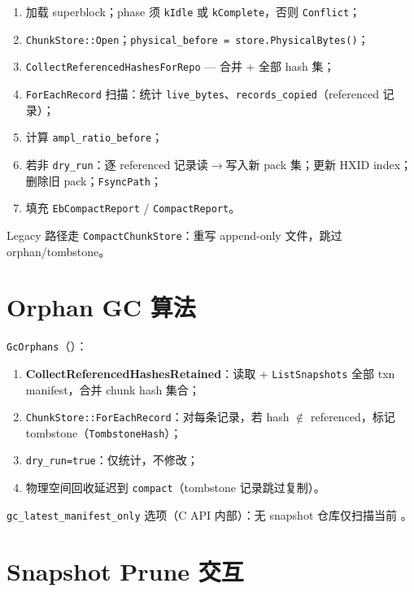 \begin{enumerate}
  \item 加载 superblock；phase 须 \texttt{kIdle} 或 \texttt{kComplete}，否则 \texttt{Conflict}；
  \item \texttt{ChunkStore::Open}；\texttt{physical\_before = store.PhysicalBytes()}；
  \item \texttt{CollectReferencedHashesForRepo} — 合并  + 全部  hash 集；
  \item \texttt{ForEachRecord} 扫描：统计 \texttt{live\_bytes}、\texttt{records\_copied}（referenced 记录）；
  \item 计算 \texttt{ampl\_ratio\_before}；
  \item 若非 \texttt{dry\_run}：逐 referenced 记录读$\rightarrow$写入新 pack 集；更新 HXID index；删除旧 pack；\texttt{FsyncPath}；
  \item 填充 \texttt{EbCompactReport} / \texttt{CompactReport}。
\end{enumerate}

Legacy  路径走 \texttt{CompactChunkStore}：重写 append-only 文件，跳过 orphan/tombstone。

\section{Orphan GC 算法}

\texttt{GcOrphans}（）：

\begin{enumerate}
  \item \textbf{CollectReferencedHashesRetained}：读取  + \texttt{ListSnapshots} 全部 txn manifest，合并 chunk hash 集合；
  \item \texttt{ChunkStore::ForEachRecord}：对每条记录，若 hash $\notin$ referenced，标记 tombstone（\texttt{TombstoneHash}）；
  \item \texttt{dry\_run=true}：仅统计，不修改；
  \item 物理空间回收延迟到 \texttt{compact}（tombstone 记录跳过复制）。
\end{enumerate}

\texttt{gc\_latest\_manifest\_only} 选项（C API 内部）：无 snapshot 仓库仅扫描当前 。

\section{Snapshot Prune 交互}

